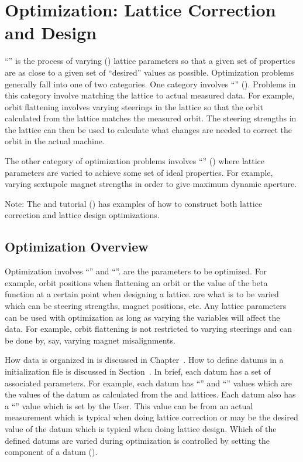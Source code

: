 \chapter{Optimization: Lattice Correction and Design}
\label{c:opti}


``'' is the process of varying  () lattice parameters so
that a given set of properties are as close to a given set of ``desired'' values as
possible. Optimization problems generally fall into one of two categories. One category involves
``'' (). Problems in this category involve matching
the  lattice to actual measured data. For example, orbit flattening involves varying
steerings in the  lattice so that the orbit calculated from the  lattice matches
the measured orbit. The steering strengths in the  lattice can then be used to calculate
what changes are needed to correct the orbit in the actual machine.

The other category of optimization problems involves ``'' ()
where lattice parameters are varied to achieve some set of ideal properties. For example, varying
sextupole magnet strengths in order to give maximum dynamic aperture.

Note: The \bmad and \tao tutorial () has examples of how to construct both lattice
correction and lattice design optimizations.

\section{Optimization Overview}
\label{s:opt.main}

Optimization involves ``'' and ``''.  are the parameters to be
optimized. For example, orbit positions when flattening an orbit or the value of the beta function
at a certain point when designing a lattice.  are what is to be varied which can be
steering strengths, magnet positions, etc. Any lattice parameters can be used with optimization as
long as varying the variables will affect the data. For example, orbit flattening is not restricted
to varying steerings and can be done by, say, varying magnet misalignments.

How data is organized in \tao is discussed in Chapter~. How to define datums in a \tao
initialization file is discussed in Section~. In brief, each datum has a set of
associated parameters. For example, each datum has ``'' and ``'' values which
are the values of the datum as calculated from the  and  lattices. Each datum
also has a ``'' value which is set by the User. This value can be from an actual
measurement which is typical when doing lattice correction or may be the desired value of the datum
which is typical when doing lattice design. Which of the defined datums are varied during optimization
is controlled by setting the  component of a datum ().

